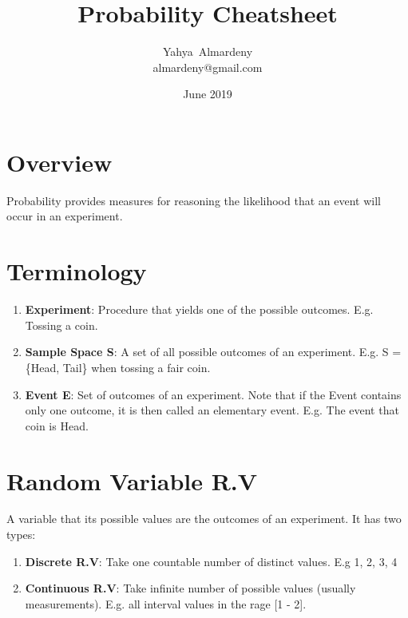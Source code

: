 \documentclass[11pt, twocolumn]{article}
\title{Probability Cheatsheet}
\author{Yahya~Almardeny\\almardeny@gmail.com}
\date{June 2019}
\begin{document}
\begin{titlepage}
\maketitle
\end{titlepage}

\section{Overview}
Probability provides measures for reasoning the likelihood that an event will occur in an experiment.
\section{Terminology}
\begin{enumerate}
\item \textbf{Experiment}: Procedure that yields one of the possible outcomes. E.g. Tossing a coin.
\item \textbf{Sample Space S}: A set of all possible outcomes of an experiment. E.g. S = \{Head, Tail\} when tossing a fair coin.
\item \textbf{Event E}: Set of outcomes of an experiment. Note that if the Event contains only one outcome, it is then called an elementary event. E.g. The event that coin is Head.
\end{enumerate}
\section{Random Variable R.V}
A variable that its possible values are the outcomes of an experiment. It has two types:
\begin{enumerate}
\item \textbf{Discrete R.V}: Take one countable number of distinct values. E.g 1, 2, 3, 4
\item \textbf{Continuous R.V}: Take infinite number of possible values (usually measurements). E.g. all interval values in the rage [1 - 2].
\end{enumerate}
\end{document}
